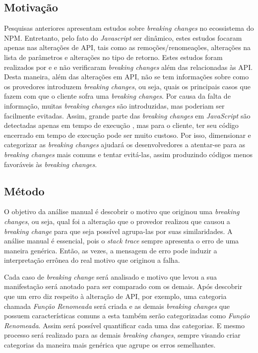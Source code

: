 \subsection{Motivação}
\label{mot:rq2}
Pesquisas anteriores apresentam estudos sobre \textit{breaking changes} no ecossistema do \gls{NPM}. Entretanto, pelo fato do \textit{Javascript} ser dinâmico, estes estudos focaram apenas nas alterações de \gls{API}, tais como as remoções/renomeações, alterações na lista de parâmetros e alterações no tipo de retorno. Estes estudos foram realizados por   e  e não verificaram \textit{breaking changes} além das relacionadas às \gls{API}. Desta maneira, além das alterações em \gls{API}, não se tem informações sobre como os provedores introduzem \textit{breaking changes}, ou seja, quais os principais casos que fazem com que o cliente sofra uma \textit{breaking changes}. Por causa da falta de informação, muitas \textit{breaking changes} são introduzidas, mas poderiam ser facilmente evitadas. Assim, grande parte das \textit{breaking changes} em \textit{JavaScript} são detectadas apenas em tempo de execução \cite{noregrets2018}, mas para o cliente, ter seu código encerrado em tempo de execução pode ser muito custoso. Por isso, dimensionar e categorizar as \textit{breaking changes} ajudará os desenvolvedores a atentar-se para as \textit{breaking changes} mais comuns e tentar evitá-las, assim produzindo códigos menos favoráveis às \textit{breaking changes}.

\subsection{Método}
\label{apr:rq2}

O objetivo da análise manual é descobrir o motivo que originou uma \textit{breaking changes}, ou seja, qual foi a alteração que o provedor realizou que causou a \textit{breaking change} para que seja possível agrupa-las por suas similaridades. A análise manual é essencial, pois o \textit{stack trace} sempre apresenta o erro de uma maneira genérica. Então, as vezes, a mensagem de erro pode induzir a interpretação errônea do real motivo que originou a falha.

Cada caso de \textit{breaking change} será analisado e motivo que levou a sua manifestação será anotado para ser comparado com os demais. Após descobrir que um erro diz respeito à alteração de \gls{API}, por exemplo, uma categoria chamada \textit{Função Renomeada} será criada e as demais \textit{breaking changes} que possuem características comuns a esta também serão categorizadas como \textit{Função Renomeada}. Assim será possível quantificar cada uma das categorias. E mesmo processo será realizado para as demais \textit{breaking changes}, sempre visando criar categorias da maneira mais genérica que agrupe os erros semelhantes.

